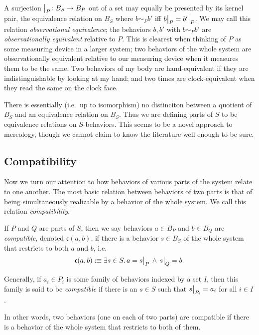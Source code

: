 A surjection $\big|_{P}\colon B_S\to B_P$ out of a set may equally be presented by its kernel pair, the equivalence relation on $B_S$ where $b\sim_P b'$ iff $b\big|_{P}=b'\big|_{P}$. We may call this relation \emph{observational equivalence}; the behaviors $b,b'$ with $b\sim_Pb'$ are \emph{observationally equivalent} relative to $P$. This is clearest when thinking of $P$ as some measuring device in a larger system; two behaviors of the whole system are observationally equivalent relative to our measuring device when it measures them to be the same. Two behaviors of my body are hand-equivalent if they are indistinguishable by looking at my hand; and two times are clock-equivalent when they read the same on the clock face.

There is essentially (i.e.\ up to isomorphism) no distinciton between a quotient of $B_S$ and an equivalence relation on $B_S$. Thus we are defining parts of $S$ to be equivalence relations on $S$-behaviors. This seems to be a novel approach to mereology, though we cannot claim to know the literature well enough to be sure.

\subsection{Compatibility}

Now we turn our attention to how behaviors of various parts of the system relate to one another. The most basic relation between behaviors of two parts is that of being simultaneously realizable by a behavior of the whole system. We call this relation \emph{compatibility}.

\begin{defn}\label{defn:compatible}
If $P$ and $Q$ are parts of $S$, then we say behaviors $a \in B_P$ and $b \in B_Q$ are \emph{compatible}, denoted $\mathfrak{c}(a, b)$, if there is a behavior $s \in B_S$ of the whole system that restricts to both $a$ and $b$, i.e.\
$$\mathfrak{c}(a, b) :\equiv \exists s \in S.\, a = s\big|_{P}\, \wedge\, s\big|_{Q} = b.$$

Generally, if $a_i \in P_i$ is some family of behaviors indexed by a set $I$, then this family is said to be \emph{compatible} if there is an $s \in S$ such that $s\big|_{P_i} = a_i$ for all $i\in I$.
\end{defn}

In other words, two behaviors (one on each of two parts) are compatible if there is a behavior of the whole system that restricts to both of them. 

